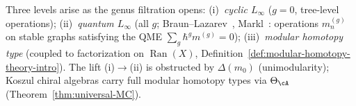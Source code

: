 \begin{remark}
\label{rem:quantum-vs-cyclic-linf}
Three levels arise as the genus filtration opens:
(i)~\emph{cyclic $L_\infty$} ($g = 0$, tree-level operations);
(ii)~\emph{quantum $L_\infty$} (all $g$; Braun--Lazarev~\cite{BL15},
Markl~\cite{Markl06}: operations $m^{(g)}_n$ on stable graphs
satisfying the QME $\sum_g \hbar^g m^{(g)} = 0$);
(iii)~\emph{modular homotopy type} (coupled to factorization on
$\operatorname{Ran}(X)$,
Definition~\ref{def:modular-homotopy-theory-intro}).
The lift (i)$\to$(ii) is obstructed by $\Delta(m_0)$ (unimodularity);
Koszul chiral algebras carry full modular homotopy types via
$\Theta_\cA$ (Theorem~\ref{thm:universal-MC}).
\end{remark}

